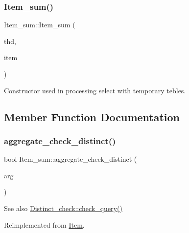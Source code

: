 \subsubsection{\texorpdfstring{Item\+\_\+sum()}{Item\_sum()}}
{\footnotesize\ttfamily Item\+\_\+sum\+::\+Item\+\_\+sum (\begin{DoxyParamCaption}\item[{T\+HD $\ast$}]{thd,  }\item[{\mbox{\hyperlink{classItem__sum}{Item\+\_\+sum}} $\ast$}]{item }\end{DoxyParamCaption})}

Constructor used in processing select with temporary tebles. 

\subsection{Member Function Documentation}
\mbox{\label{classItem__sum_a469f9e37bdb5f0c186b4fc2190f01fdb}} 
\subsubsection{\texorpdfstring{aggregate\+\_\+check\+\_\+distinct()}{aggregate\_check\_distinct()}}
{\footnotesize\ttfamily bool Item\+\_\+sum\+::aggregate\+\_\+check\+\_\+distinct (\begin{DoxyParamCaption}\item[{uchar $\ast$}]{arg }\end{DoxyParamCaption})\hspace{0.3cm}{\ttfamily [virtual]}}

\begin{DoxySeeAlso}{See also}
\mbox{\hyperlink{group__AGGREGATE__CHECKS_ga83e75b415b78e10ade375ad320ea446c}{Distinct\+\_\+check\+::check\+\_\+query()}} 
\end{DoxySeeAlso}


Reimplemented from \mbox{\hyperlink{classItem_a7291ce9a64c0201c71463033b4346df4}{Item}}.

\mbox{\label{classItem__sum_acc4dbcc4a2da3750ff11bf372fd973f5}} 
